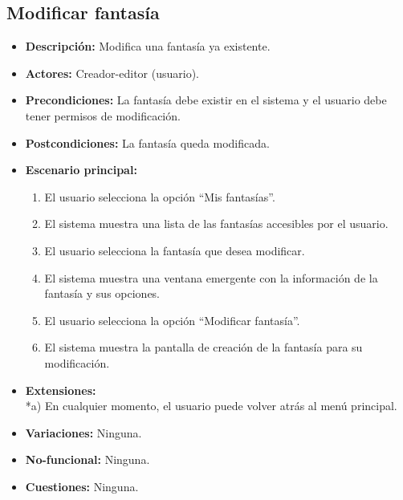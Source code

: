 \subsection{Modificar fantasía}
\begin{itemize}
	\item \textbf{Descripción:} Modifica una fantasía ya existente.
	\item \textbf{Actores:} Creador-editor (usuario).
	\item \textbf{Precondiciones:} La fantasía debe existir en el sistema y el usuario debe tener permisos de modificación.
	\item \textbf{Postcondiciones:} La fantasía queda modificada.
	\item \textbf{Escenario principal:}
	\begin{enumerate}
		\item El usuario selecciona la opción ``Mis fantasías''.
		\item El sistema muestra una lista de las fantasías accesibles por el usuario.
		\item El usuario selecciona la fantasía que desea modificar.
		\item El sistema muestra una ventana emergente con la información de la fantasía y sus opciones.
		\item El usuario selecciona la opción ``Modificar fantasía''.
		\item El sistema muestra la pantalla de creación de la fantasía para su modificación.
	\end{enumerate}
	\item \textbf{Extensiones:} \\ *a) En cualquier momento, el usuario puede volver atrás al menú principal.
	\item \textbf{Variaciones:} Ninguna.
	\item \textbf{No-funcional:} Ninguna.
	\item \textbf{Cuestiones:} Ninguna.
\end{itemize}

